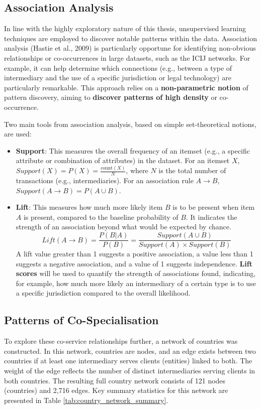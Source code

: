 \subsection{Association Analysis}
\label{subsec:unsupervised_learning}
In line with the highly exploratory nature of this thesis, unsupervised learning techniques are employed to discover notable patterns within the data. Association analysis (Hastie et al., 2009) is particularly opportune for identifying non-obvious relationships or co-occurrences in large datasets, such as the ICIJ networks. For example, it can help determine which connections (e.g., between a type of intermediary and the use of a specific jurisdiction or legal technology) are particularly remarkable. This approach relies on a \textbf{non-parametric notion} of pattern discovery, aiming to \textbf{discover patterns of high density} or co-occurrence.

Two main tools from association analysis, based on simple set-theoretical notions, are used:
\begin{itemize}
    \item \textbf{Support}: This measures the overall frequency of an itemset (e.g., a specific attribute or combination of attributes) in the dataset. For an itemset $X$, $Support(X) = P(X) = \frac{\text{count}(X)}{N}$, where $N$ is the total number of transactions (e.g., intermediaries). For an association rule $A \rightarrow B$, $Support(A \rightarrow B) = P(A \cup B)$.
    \item \textbf{Lift}: This measures how much more likely item $B$ is to be present when item $A$ is present, compared to the baseline probability of $B$. It indicates the strength of an association beyond what would be expected by chance.
    \begin{equation}
        Lift(A \rightarrow B) = \frac{P(B|A)}{P(B)} = \frac{Support(A \cup B)}{Support(A) \times Support(B)}
    \end{equation}
    A lift value greater than 1 suggests a positive association, a value less than 1 suggests a negative association, and a value of 1 suggests independence. \textbf{Lift scores} will be used to quantify the strength of associations found, indicating, for example, how much more likely an intermediary of a certain type is to use a specific jurisdiction compared to the overall likelihood.
\end{itemize}

\subsection{Patterns of Co-Specialisation}
To explore these co-service relationships further, a network of countries was constructed. In this network, countries are nodes, and an edge exists between two countries if at least one intermediary serves clients (entities) linked to both. The weight of the edge reflects the number of distinct intermediaries serving clients in both countries. The resulting full country network consists of 121 nodes (countries) and 2,716 edges. Key summary statistics for this network are presented in Table \ref{tab:country_network_summary}. 

